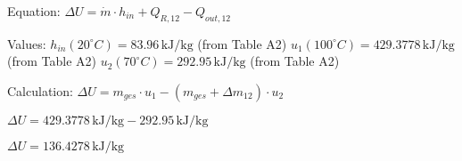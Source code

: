 Equation:  
\( \Delta U = \dot{m} \cdot h_{in} + Q_{R,12} - Q_{out,12} \)  

Values:  
\( h_{in}(20^\circ C) = 83.96 \, \text{kJ/kg} \) (from Table A2)  
\( u_1(100^\circ C) = 429.3778 \, \text{kJ/kg} \) (from Table A2)  
\( u_2(70^\circ C) = 292.95 \, \text{kJ/kg} \) (from Table A2)  

Calculation:  
\( \Delta U = m_{ges} \cdot u_1 - (m_{ges} + \Delta m_{12}) \cdot u_2 \)  

\( \Delta U = 429.3778 \, \text{kJ/kg} - 292.95 \, \text{kJ/kg} \)  

\( \Delta U = 136.4278 \, \text{kJ/kg} \)